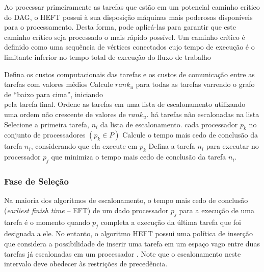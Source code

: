 Ao processar primeiramente as tarefas que estão em um potencial caminho crítico
do DAG, o HEFT possui à sua disposição máquinas mais poderosas disponíveis para
o processamento. Desta forma, pode aplicá-las para garantir que este caminho
crítico seja processado o mais rápido possível. Um caminho crítico é definido
como uma sequência de vértices conectados cujo tempo de execução é o limitante
inferior no tempo total de execução do fluxo de trabalho

\begin{codebox}
\li	Defina os custos computacionais das tarefas e os custos de comunicação entre as tarefas
\zi com valores médios
\li	Calcule $rank_u$ para todas as tarefas varrendo o grafo de ``baixo para cima'',
	iniciando \\pela tarefa final.
\li Ordene as tarefas em uma lista de escalonamento utilizando uma ordem não
\zi crescente de valores de $rank_u$.
\li 	\While há tarefas não escalonadas na lista
\li 		\Do
				Selecione a primeira tarefa, $n_i$ da lista de escalonamento.
\li				\For cada processador $p_k$ no conjunto de processadores $(p_k \in P)$
\li 				\Do
						Calcule o tempo mais cedo de conclusão da tarefa  $n_i$,
						considerando que ela execute 
\zi         em $p_k$
					\End
\li				Defina a tarefa $n_i$ para executar no processador $p_j$ que
					minimiza o tempo mais
\zi       cedo de conclusão da tarefa $n_i$.
			\End
\End
\end{codebox}

\subsubsection{Fase de Seleção}
Na maioria dos algoritmos de escalonamento, o tempo mais cedo de
conclusão (\emph{earliest finish time} -- EFT) de um dado
processador $p_j$ para a execução de uma tarefa é o momento quando
$p_j$ completa a execução da última tarefa que foi designada a
ele. No entanto, o algoritmo HEFT possui uma política de inserção
que considera a possibilidade de inserir uma tarefa em um espaço
vago entre duas tarefas já escalonadas em um processador
\cite{topcoglu:heft}.
Note que o escalonamento neste intervalo deve obedecer às
restrições de precedência.


